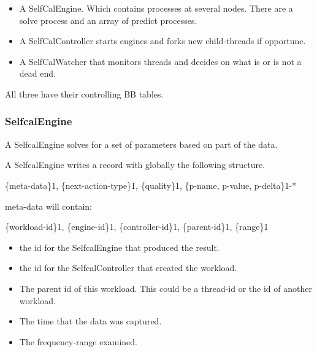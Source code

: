 \documentclass[]{lofar}
\begin{document}
      \begin{itemize}

	\item 

          A SelfCalEngine. Which contains processes at several
          nodes. There are a solve process and an array of predict
          processes.

	\item 

          A SelfCalController starts engines and forks new
          child-threads if opportune.

	\item 

          A SelfCalWatcher that monitors threads and decides on what
          is or is not a dead end.

      \end{itemize}

      All three have their controlling BB tables.

      \subsubsection{SelfcalEngine}
      \label{id2721640}\hypertarget{id2721640}{}%

        A SelfcalEngine solves for a set of parameters based on part
        of the data.

        A SelfcalEngine writes a record with globally the following
        structure.

        \{meta-data\}1, \{next-action-type\}1, \{quality\}1, \{p-name, p-value, p-delta\}1-*

        meta-data will contain:

        \{workload-id\}1, \{engine-id\}1, \{controller-id\}1, \{parent-id\}1, \{range\}1

        \begin{itemize}

	  \item 

            the id for the SelfcalEngine that produced the result.

	  \item 

            the id for the SelfcalController that created the workload.

	  \item 

            The parent id of this workload. This could be a thread-id
            or the id of another workload.

	  \item 

            The time that the data was captured.

	  \item 

            The frequency-range examined.

        \end{itemize}
\end{document}
